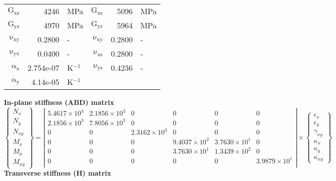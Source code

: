 \begin{table}[!htbp]
\begin{tabular}[t]{rrlrrl}
      $\mathrm{G_{xz}}$ &     4246 & MPa & $\mathrm{G_{xz}}$ &     5096 & MPa\\
      $\mathrm{G_{yz}}$ &     4970 & MPa &  $\mathrm{G_{yz}}$ &     5964 & MPa\\
      $\mathrm{\nu_{xy}}$ & 0.2800 &- &$\mathrm{\nu_{xy}}$ & 0.2800 &-\\
      $\mathrm{\nu_{yx}}$ & 0.0400 &- & $\mathrm{\nu_{xz}}$ & 0.2800 &-\\
      $\mathrm{\alpha_x}$ & 2.754e-07 & K$^{-1}$ &$\mathrm{\nu_{yz}}$ & 0.4236 &-\\
      $\mathrm{\alpha_y}$ & 4.14e-05 & K$^{-1}$\\
      \bottomrule
    \end{tabular}
  \vbox{
    \vbox{\small\textbf{In-plane stiffness (ABD) matrix}\\[-3mm]
      \tiny\[\left\{\begin{array}{c}
          N_x\\ N_y\\ N_{xy}\\ M_x\\ M_y\\ M_{xy}
        \end{array}\right\} = 
      \left|\begin{array}{cccccc}
           5.4617\times 10^{4} &  2.1856\times 10^{3} & 0 & 0 & 0 & 0\\
           2.1856\times 10^{3} &  7.8056\times 10^{3} & 0 & 0 & 0 & 0\\
          0 & 0 &  2.3162\times 10^{3} & 0 & 0 & 0\\
          0 & 0 & 0 &  9.4037\times 10^{2} &  3.7630\times 10^{1} & 0\\
          0 & 0 & 0 &  3.7630\times 10^{1} &  1.3439\times 10^{2} & 0\\
          0 & 0 & 0 & 0 & 0 &  3.9879\times 10^{1}\\
          \end{array}\right| \times
        \left\{\begin{array}{c}
            \epsilon_x\\[2pt] \epsilon_y\\[2pt] \gamma_{xy}\\[2pt]
            \kappa_x\\[2pt] \kappa_y\\[2pt] \kappa_{xy}
          \end{array}\right\}\]
    }
    \vbox{\small\textbf{Transverse stiffness (H) matrix}\\[-2mm]
}}
\end{table}
